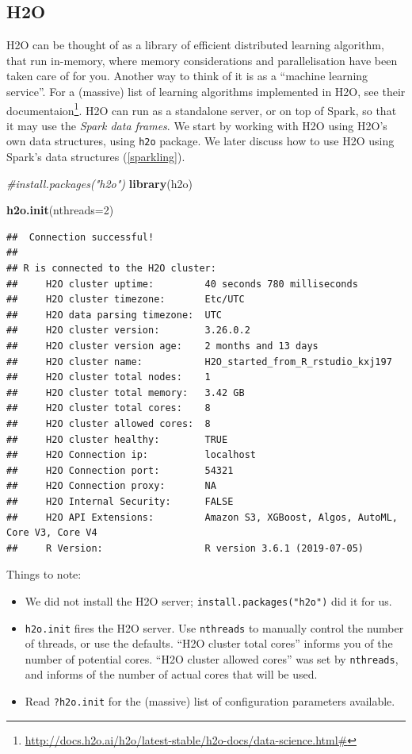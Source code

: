 \documentclass[]{book}
\newenvironment{Shaded}{\begin{snugshade}}{\end{snugshade}}
\newcommand{\CommentTok}[1]{\textcolor[rgb]{0.56,0.35,0.01}{\textit{#1}}}
\newcommand{\DataTypeTok}[1]{\textcolor[rgb]{0.13,0.29,0.53}{#1}}
\newcommand{\DecValTok}[1]{\textcolor[rgb]{0.00,0.00,0.81}{#1}}
\newcommand{\KeywordTok}[1]{\textcolor[rgb]{0.13,0.29,0.53}{\textbf{#1}}}
\newcommand{\NormalTok}[1]{#1}
\providecommand{\tightlist}{%
  \setlength{\itemsep}{0pt}\setlength{\parskip}{0pt}}
\renewcommand{\href}[2]{#2\footnote{\url{#1}}}
\theoremstyle{definition}
\theoremstyle{definition}
\theoremstyle{definition}
\theoremstyle{remark}
\begin{document}
\hypertarget{h2o}{%
\subsection{H2O}\label{h2o}}

H2O can be thought of as a library of efficient distributed learning algorithm, that run in-memory, where memory considerations and parallelisation have been taken care of for you.
Another way to think of it is as a ``machine learning service''.
For a (massive) list of learning algorithms implemented in H2O, see \href{http://docs.h2o.ai/h2o/latest-stable/h2o-docs/data-science.html\#}{their documentaion}.
H2O can run as a standalone server, or on top of Spark, so that it may use the \emph{Spark data frames}.
We start by working with H2O using H2O's own data structures, using \texttt{h2o} package.
We later discuss how to use H2O using Spark's data structures (\ref{sparkling}).

\begin{Shaded}
\begin{Highlighting}[]
\CommentTok{#install.packages("h2o") }
\KeywordTok{library}\NormalTok{(h2o)}

\KeywordTok{h2o.init}\NormalTok{(}\DataTypeTok{nthreads=}\DecValTok{2}\NormalTok{) }
\end{Highlighting}
\end{Shaded}

\begin{verbatim}
##  Connection successful!
## 
## R is connected to the H2O cluster: 
##     H2O cluster uptime:         40 seconds 780 milliseconds 
##     H2O cluster timezone:       Etc/UTC 
##     H2O data parsing timezone:  UTC 
##     H2O cluster version:        3.26.0.2 
##     H2O cluster version age:    2 months and 13 days  
##     H2O cluster name:           H2O_started_from_R_rstudio_kxj197 
##     H2O cluster total nodes:    1 
##     H2O cluster total memory:   3.42 GB 
##     H2O cluster total cores:    8 
##     H2O cluster allowed cores:  8 
##     H2O cluster healthy:        TRUE 
##     H2O Connection ip:          localhost 
##     H2O Connection port:        54321 
##     H2O Connection proxy:       NA 
##     H2O Internal Security:      FALSE 
##     H2O API Extensions:         Amazon S3, XGBoost, Algos, AutoML, Core V3, Core V4 
##     R Version:                  R version 3.6.1 (2019-07-05)
\end{verbatim}

Things to note:

\begin{itemize}
\tightlist
\item
  We did not install the H2O server; \texttt{install.packages("h2o")} did it for us.
\item
  \texttt{h2o.init} fires the H2O server. Use \texttt{nthreads} to manually control the number of threads, or use the defaults. ``H2O cluster total cores'' informs you of the number of potential cores. ``H2O cluster allowed cores'' was set by \texttt{nthreads}, and informs of the number of actual cores that will be used.
\item
  Read \texttt{?h2o.init} for the (massive) list of configuration parameters available.
\end{itemize}
\end{document}
